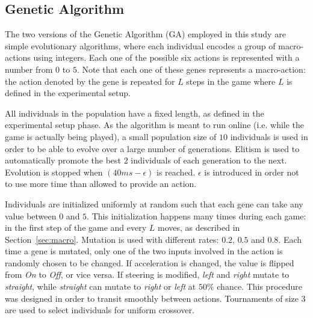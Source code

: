 \documentclass{sig-alternate}
\begin{document}
%

\subsection{Genetic Algorithm}

The two versions of the Genetic Algorithm (GA) employed in this study are simple evolutionary algorithms, where each individual encodes a group of macro-actions using integers. Each one of the possible six actions is represented with a number from $0$ to $5$. Note that each one of these genes represents a macro-action: the action denoted by the gene is repeated for $L$ steps in the game where $L$ is defined in the experimental setup. 

All individuals in the population have a fixed length, as defined in the experimental setup phase. As the algorithm is meant to run online (i.e. while the game is actually being played), a small population size of $10$ individuals is used in order to be able to evolve over a large number of generations. Elitism is used to automatically promote the best $2$ individuals of each generation to the next. Evolution is stopped when $(40ms - \epsilon)$ is reached. $\epsilon$ is introduced in order not to use more time than allowed to provide an action.

Individuals are initialized uniformly at random such that each gene can take any value between $0$ and $5$. This initialization happens many times during each game: in the first step of the game and every $L$ moves, as described in Section~\ref{sec:macro}. Mutation is used with different rates: $0.2$, $0.5$ and $0.8$. Each time a gene is mutated, only one of the two inputs involved in the action is randomly chosen to be changed. If acceleration is changed, the value is flipped from \textit{On} to \textit{Off}, or vice versa. If steering is modified, \textit{left} and \textit{right} mutate to \textit{straight}, while \textit{straight} can mutate to \textit{right} or \textit{left} at $50\%$ chance. This procedure was designed in order to transit smoothly between actions. Tournaments of size $3$ are used to select individuals for uniform crossover.
\end{document}
